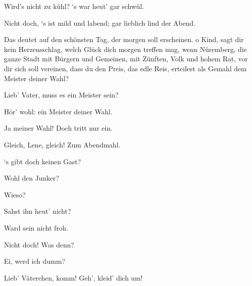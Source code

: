 \begin{drama}
\Evaspeaks
Wird's nicht zu kühl?
‘s war heut' gar schwül.

\Pognerspeaks
Nicht doch, ‘s ist mild und labend; gar lieblich lind der Abend.


Das deutet auf den schönsten Tag,
der morgen soll erscheinen.
o Kind, sagt dir kein Herzensschlag,
welch Glück dich morgen treffen mag,
wenn Nüremberg, die ganze Stadt
mit Bürgern und Gemeinen,
mit Zünften, Volk und hohem Rat,
vor dir sich soll vereinen,
dass du den Preis, das edle Reis,
erteilest als Gemahl
dem Meister deiner Wahl?

\Evaspeaks
Lieb' Vater, muss es ein Meister sein?

\Pognerspeaks
Hör' wohl: ein Meister deiner Wahl.



\Evaspeaks


Ja meiner Wahl! Doch tritt nur ein.


Gleich, Lene, gleich! Zum Abendmahl.



\Pognerspeaks


‘s gibt doch keinen Gast?

\Evaspeaks


Wohl den Junker?

\Pognerspeaks


Wieso?

\Evaspeaks
Sahst ihn heut' nicht?

\Pognerspeaks


Ward sein nicht froh.


Nicht doch! Was denn?


Ei, werd ich dumm?

\Evaspeaks
Lieb' Väterchen, komm! Geh', kleid' dich um!

\Pognerspeaks


\end{drama}
